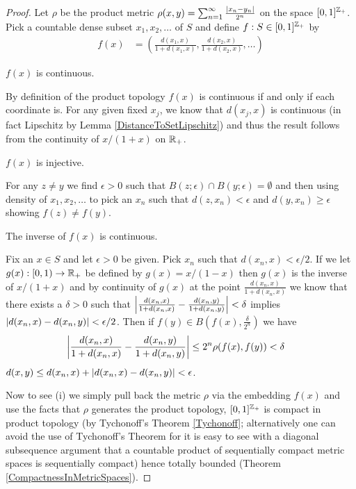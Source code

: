 \begin{proof}
Let $\rho$ be the product metric $\rho(x,y) = \sum_{n=1}^\infty
\frac{\left \vert x_n-y_n \right \vert}{2^n}$ on the space $[0,1]^{\mathbb{Z}_+}$. 
 Pick a countable dense subset $x_1, x_2, \dotsc$ of $S$ and define 
$f : S \in [0,1]^{\mathbb{Z}_+}$ by 
\begin{align*}
f(x) &= \left ( \frac{d(x_1, x)}{1 + d(x_1, x)}, \frac{d(x_2, x)}{1 +
    d(x_2, x)}, \dotsc \right )
\end{align*}
 
\begin{clm}$f(x)$ is continuous.
\end{clm}

By definition of the product topology $f(x)$ is continuous if and only
if each coordinate is.  For any given fixed $x_j$, we know that
$d(x_j, x)$ is continuous (in fact Lipschitz by Lemma
\ref{DistanceToSetLipschitz}) and thus the result follows from the
continuity of $x/(1+x)$ on $\mathbb{R}_+$.

\begin{clm}$f(x)$ is injective.
\end{clm}

For any $z \neq y$ we find $\epsilon > 0$ such that $B(z ; \epsilon)
\cap B( y ; \epsilon) = \emptyset$ and then using density of $x_1,
x_2, \dotsc$ to pick an $x_n$ such that $d(z,x_n) < \epsilon$ and
$d(y, x_n) \geq \epsilon$ showing $f(z) \neq f(y)$.  

\begin{clm}The inverse of $f(x)$ is continuous.
\end{clm}

Fix an $x \in S$ and let $\epsilon >0$ be given.  Pick $x_n$ such that
$d(x_n, x) < \epsilon/2$.  If we let $g(x) : [0,1) \to \mathbb{R}_+$ be
defined by $g(x) = x/(1-x)$ then $g(x)$ is the inverse of $x/(1+x)$ 
and by continuity of $g(x)$ at the point $\frac{d(x_n, x)}{1+d(x_n,x)}$ we know that there exists a $\delta > 0$
such that $\left \vert \frac{d(x_n, x)}{1+d(x_n,x)} - 
\frac{d(x_n,  y)}{1+d(x_n,y)} \right \vert< \delta$ implies $\left \vert d(x_n,x) - d(x_n,y) \right \vert <
  \epsilon/2$.
Then if $f(y) \in B(f(x), \frac{\delta}{2^n})$ we have
\begin{align*}
\left \vert \frac{d(x_n, x)}{1+d(x_n,x)} - 
\frac{d(x_n,  y)}{1+d(x_n,y)} \right \vert &\leq 2^n \rho(f(x), f(y)) < \delta
\end{align*}
$d(x,y) \leq d(x_n,x) + \left \vert d(x_n,x) - d(x_n,y) \right \vert < \epsilon$.

Now to see (i) we simply pull back the metric $\rho$ via the embedding
$f(x)$ and use the facts that $\rho$ generates the product topology,
$[0,1]^{\mathbb{Z}_+}$ is compact in product topology
(by Tychonoff's Theorem \ref{Tychonoff}; alternatively one can avoid
the use of Tychonoff's Theorem for it is easy to
see with a diagonal subsequence argument that a countable product of
sequentially compact metric spaces is sequentially compact) hence totally bounded (Theorem
\ref{CompactnessInMetricSpaces}).


\end{proof}
